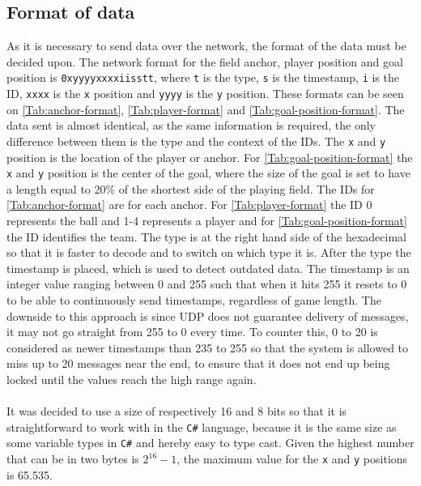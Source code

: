 \subsection{Format of data}\label{subsec:data-format}
As it is necessary to send data over the network, the format of the data must be decided upon.
The network format for the field anchor, player position and goal position is \texttt{0xyyyyxxxxiisstt}, where \texttt{t} is the type, \texttt{s} is the timestamp, \texttt{i} is the ID, \texttt{xxxx} is the \texttt{x} position and \texttt{yyyy} is the \texttt{y} position.
These formats can be seen on \autoref{Tab:anchor-format}, \autoref{Tab:player-format} and \autoref{Tab:goal-position-format}.
The data sent is almost identical, as the same information is required, the only difference between them is the type and the context of the IDs.
The \texttt{x} and \texttt{y} position is the location of the player or anchor.
For \autoref{Tab:goal-position-format} the \texttt{x} and \texttt{y} position is the center of the goal, where the size of the goal is set to have a length equal to 20\% of the shortest side of the playing field.
The IDs for \autoref{Tab:anchor-format} are for each anchor.
For \autoref{Tab:player-format} the ID 0 represents the ball and 1-4 represents a player and for \autoref{Tab:goal-position-format} the ID identifies the team.
The type is at the right hand side of the hexadecimal so that it is faster to decode and to switch on which type it is.
After the type the timestamp is placed, which is used to detect outdated data.
The timestamp is an integer value ranging between 0 and 255 such that when it hits 255 it resets to 0 to be able to continuously send timestamps, regardless of game length.
The downside to this approach is since UDP does not guarantee delivery of messages, it may not go straight from 255 to 0 every time.
To counter this, 0 to 20 is considered as newer timestamps than 235 to 255 so that the system is allowed to miss up to 20 messages near the end, to ensure that it does not end up being locked until the values reach the high range again.
\\\\
It was decided to use a size of respectively 16 and 8 bits so that it is straightforward to work with in the \texttt{C\#} language, because it is the same size as some variable types in \texttt{C\#} and hereby easy to type cast.
Given the highest number that can be in two bytes is $2^{16} - 1$, the maximum value for the \texttt{x} and \texttt{y} positions is 65.535.

